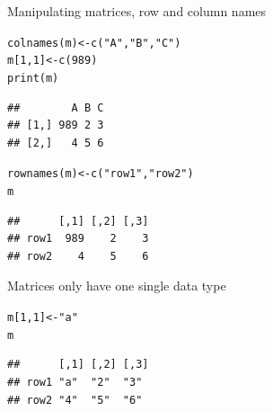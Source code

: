 \documentclass[xcolor=table,           xcolor=dvipsnames]{beamer}\usepackage[]{graphicx}\usepackage[]{color}
\makeatletter
\newcommand{\hlnum}[1]{\textcolor[rgb]{0,0,0}{#1}}
\newcommand{\hlstr}[1]{\textcolor[rgb]{0.545,0.137,0.137}{#1}}
\newcommand{\hlstd}[1]{\textcolor[rgb]{0,0,0}{#1}}
\newcommand{\hlkwb}[1]{\textcolor[rgb]{0,0,0}{#1}}
\newcommand{\hlkwd}[1]{\textcolor[rgb]{0,0,1}{#1}}
\newenvironment{kframe}{%
 \def\at@end@of@kframe{}%
 \ifinner\ifhmode%
  \def\at@end@of@kframe{\end{minipage}}%
  \begin{minipage}{\columnwidth}%
 \fi\fi%
 \def\FrameCommand##1{\hskip\@totalleftmargin \hskip-\fboxsep
 \colorbox{shadecolor}{##1}\hskip-\fboxsep
     \hskip-\linewidth \hskip-\@totalleftmargin \hskip\columnwidth}%
 \MakeFramed {\advance\hsize-\width
   \@totalleftmargin\z@ \linewidth\hsize
   \@setminipage}}%
 {\par\unskip\endMakeFramed%
 \at@end@of@kframe}
\newenvironment{knitrout}{}{} %
\makeatother
\begin{document}
\begin{frame}[fragile]{Manipulating matrices, row and column names}
\begin{knitrout}
\color{fgcolor}\begin{kframe}
\begin{alltt}
\hlkwd{colnames}\hlstd{(m)} \hlkwb{<-} \hlkwd{c}\hlstd{(}\hlstr{"A"}\hlstd{,} \hlstr{"B"}\hlstd{,} \hlstr{"C"}\hlstd{)}
\hlstd{m[}\hlnum{1}\hlstd{,}\hlnum{1}\hlstd{]} \hlkwb{<-} \hlkwd{c}\hlstd{(}\hlnum{989}\hlstd{)}
\hlkwd{print}\hlstd{(m)}
\end{alltt}
\begin{verbatim}
##        A B C
## [1,] 989 2 3
## [2,]   4 5 6
\end{verbatim}
\end{kframe}
\end{knitrout}
\begin{knitrout}
\color{fgcolor}\begin{kframe}
\begin{alltt}
\hlkwd{rownames}\hlstd{(m)} \hlkwb{<-} \hlkwd{c}\hlstd{(}\hlstr{"row1"}\hlstd{,} \hlstr{"row2"}\hlstd{)}
\hlstd{m}
\end{alltt}
\begin{verbatim}
##      [,1] [,2] [,3]
## row1  989    2    3
## row2    4    5    6
\end{verbatim}
\end{kframe}
\end{knitrout}
\end{frame}


\begin{frame}[fragile]{Matrices only have one single data type}
\begin{knitrout}
\color{fgcolor}\begin{kframe}
\begin{alltt}
\hlstd{m[}\hlnum{1}\hlstd{,}\hlnum{1}\hlstd{]} \hlkwb{<-} \hlstr{"a"}
\hlstd{m}
\end{alltt}
\begin{verbatim}
##      [,1] [,2] [,3]
## row1 "a"  "2"  "3" 
## row2 "4"  "5"  "6"
\end{verbatim}
\end{kframe}
\end{knitrout}
\end{frame}
\end{document}
